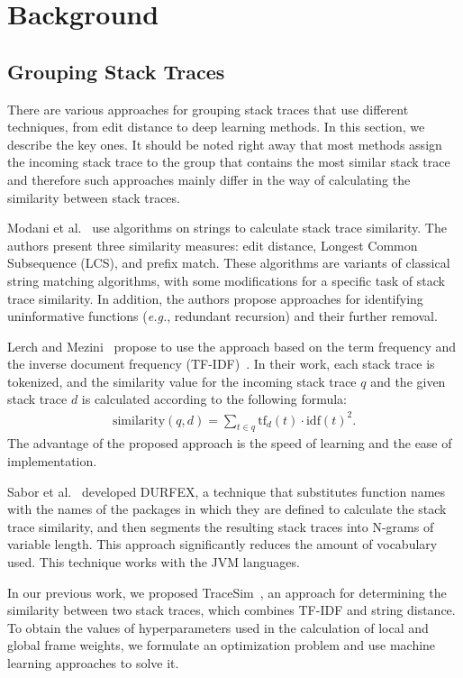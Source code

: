 \section{Background}\label{sec:background}

\subsection{Grouping Stack Traces}

There are various approaches for grouping stack traces that use different techniques, from edit distance to deep learning methods.
In this section, we describe the key ones.
It should be noted right away that most methods assign the incoming stack trace to the group that contains the most similar stack trace and therefore such approaches mainly differ in the way of calculating the similarity between stack traces.

Modani et al.~\cite{modani} use algorithms on strings to calculate stack trace similarity.
The authors present three similarity measures: edit distance, Longest Common Subsequence (LCS), and prefix match.
These algorithms are variants of classical string matching algorithms, with some modifications for a specific task of stack trace similarity.
In addition, the authors propose approaches for identifying uninformative functions (\textit{e.g.}, redundant recursion) and their further removal.

Lerch and Mezini~\cite{lerch} propose to use the approach based on the term frequency and the inverse document frequency (TF-IDF)~\cite{tfidf}.
In their work, each stack trace is tokenized, and the similarity value for the incoming stack trace $q$ and the given stack trace $d$ is calculated according to the following formula:
\begin{gather*}
    \mathrm{similarity}(q, d) = \sum_{t \in q} \mathrm{tf}_d(t) \cdot \mathrm{idf}(t)^2.
\end{gather*}
The advantage of the proposed approach is the speed of learning and the ease of implementation.

Sabor et al.~\cite{durfex} developed DURFEX, a technique that substitutes function names with the names of the packages in which they are defined to calculate the stack trace similarity, and then segments the resulting stack traces into N-grams of variable length.
This approach significantly reduces the amount of vocabulary used. This technique works with the JVM languages.

In our previous work, we proposed TraceSim~\cite{tracesim}, an approach for determining the similarity between two stack traces, which combines TF-IDF and string distance.
To obtain the values of hyperparameters used in the calculation of local and global frame weights, we formulate an optimization problem and use machine learning approaches to solve it.


